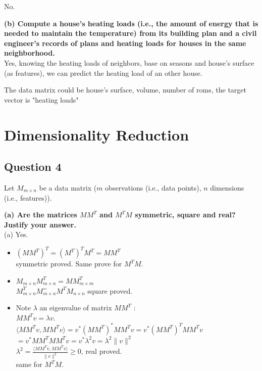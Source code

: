 \documentclass{article}
\begin{document}
No.


\vspace{1em}
{\bf (b) Compute a house’s heating loads (i.e., the amount of energy that is needed to maintain the temperature) from its building plan and a civil engineer’s records of plans and heating loads for houses in the same neighborhood.}\\


Yes, knowing the heating loads of neighbors, base on seasons and house's surface (as features), we can predict the heating load of an other house.

The data matrix could be house's surface, volume, number of roms, the target vector is "heating loads"




\newpage
\section{Dimensionality Reduction}
\subsection{Question 4}

Let $M_{m\times n}$ be a data matrix ($m$ observations (i.e., data points), $n$ dimensions (i.e., features)).

\vspace{1em}

{\bf (a) Are the matrices $MM^{T}$ and $M^{T}M$ symmetric, square and real? Justify your answer.}\\

(a) Yes.
\begin{itemize}
	\item $(MM^T)^T = (M^T)^TM^T=MM^{T}$\\ symmetric proved. Same prove for $M^{T}M$.
	\item $M_{m\times n}M_{m\times n}^T=MM^T_{m\times m}$\\  $M_{m\times n}^TM_{m\times n}^=M^TM_{n \times n}$ square proved.
	\item Note $\lambda$ an eigenvalue of matrix $MM^{T}$ : \\
	$MM^{T}v=\lambda v$. \\   $ \langle MM^{T}v,MM^{T}v\rangle = v^*(MM^T)^* MM^T v = v^* (MM^T)^T MM^T v$\\ $=v^* MM^TMM^Tv=v^* \lambda^2 v =\lambda^2 \parallel v\parallel^2$\\  ${\displaystyle \lambda^2 = \frac{\langle MM^{T}v,MM^{T}v\rangle}{\parallel v\parallel^2}\geq0}$, real proved.\\ same for $M^{T}M$.
\end{itemize}
\end{document}
